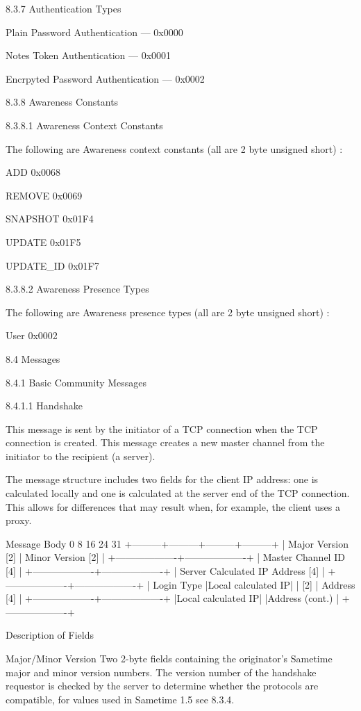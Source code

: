 \documentclass[titlepage,oneside]{book}
\begin{document}
8.3.7 Authentication Types

Plain Password Authentication                     --- 0x0000

Notes Token Authentication                        --- 0x0001

Encrpyted Password Authentication                 --- 0x0002

8.3.8 Awareness Constants

8.3.8.1 Awareness Context Constants

The following are Awareness context constants (all are 2 byte unsigned
short) :

ADD        0x0068

REMOVE     0x0069

SNAPSHOT   0x01F4

UPDATE     0x01F5

UPDATE_ID  0x01F7

8.3.8.2 Awareness Presence Types

The following are Awareness presence types (all are 2 byte unsigned
short) :

User       0x0002

8.4 Messages

8.4.1 Basic Community Messages

8.4.1.1 Handshake

This message is sent by the initiator of a TCP connection when the TCP
connection is created. This message creates a new master channel from
the initiator to the recipient (a server).

The message structure includes two fields for the client IP address:
one is calculated locally and one is calculated at the server end of
the TCP connection. This allows for differences that may result when,
for example, the client uses a proxy.

Message Body
0         8         16        24      31
+---------+---------+---------+---------+
| Major Version [2] | Minor Version [2] |
+-------------------+-------------------+
|       Master Channel ID [4]           |
+-------------------+-------------------+
|      Server Calculated IP Address [4] |
+-------------------+-------------------+
|    Login Type     |Local calculated IP|
|        [2]        |   Address [4]     |
+-------------------+-------------------+
|Local calculated IP|
|Address (cont.)    |
+-------------------+

Description of Fields

Major/Minor Version
  Two 2-byte fields containing the originator's Sametime major and
  minor version numbers. The version number of the handshake requestor
  is checked by the server to determine whether the protocols are
  compatible, for values used in Sametime 1.5 see 8.3.4.
\end{document}
